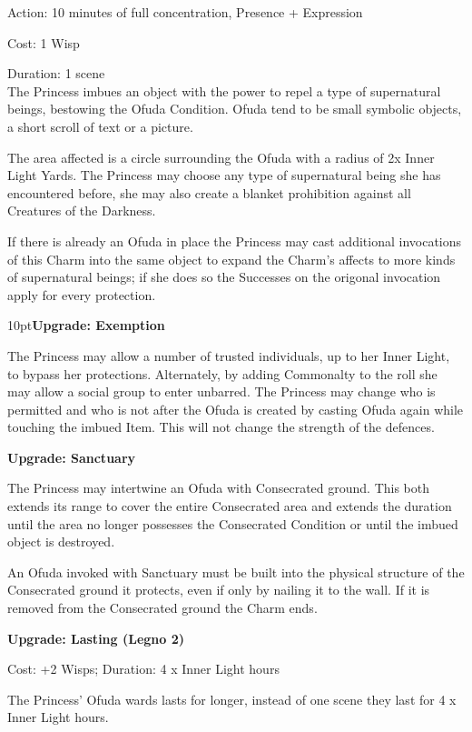 \noindent Action: 10 minutes of full concentration, Presence + Expression

\noindent Cost: 1 Wisp

\noindent Duration: 1 scene \\

\noindent The Princess imbues an object with the power to repel a type of supernatural beings, bestowing the Ofuda Condition. Ofuda tend to be small symbolic objects, a short scroll of text or a picture. 

The area affected is a circle surrounding the Ofuda with a radius of 2x Inner Light Yards. The Princess may choose any type of supernatural being she has encountered before, she may also create a blanket prohibition against all Creatures of the Darkness.

If there is already an Ofuda in place the Princess may cast additional invocations of this Charm into the same object to expand the Charm's affects to more kinds of supernatural beings; if she does so the Successes on the origonal invocation apply for every protection. 

\begin{myindentpar}{10pt}\textbf{Upgrade: Exemption}

The Princess may allow a number of trusted individuals, up to her Inner Light, to bypass her protections. Alternately, by adding Commonalty to the roll she may allow a social group to enter unbarred. The Princess may change who is permitted and who is not after the Ofuda is created by casting Ofuda again while touching the imbued Item. This will not change the strength of the defences.

\textbf{Upgrade: Sanctuary}

The Princess may intertwine an Ofuda with Consecrated ground. This both extends its range to cover the entire Consecrated area and extends the duration until the area no longer possesses the Consecrated Condition or until the imbued object is destroyed.

An Ofuda invoked with Sanctuary must be built into the physical structure of the Consecrated ground it protects, even if only by nailing it to the wall. If it is removed from the Consecrated ground the Charm ends.

\textbf{Upgrade: Lasting (Legno 2)}

Cost: +2 Wisps; Duration: 4 x Inner Light hours

The Princess' Ofuda wards lasts for longer, instead of one scene they last for 4 x Inner Light hours.\end{myindentpar}


